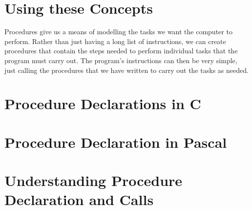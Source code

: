 
\clearpage
\section{Using these Concepts} %
\label{sec:using_these_concepts_procedure_decl}

Procedures give us a means of modelling the tasks we want the computer to perform. Rather than just having a long list of instructions, we can create procedures that contain the steps needed to perform individual tasks that the program must carry out. The program's instructions can then be very simple, just calling the procedures that we have written to carry out the tasks as needed.





\clearpage
\def\pageLang{c}
\section{Procedure Declarations in C} %
\label{sec:procedure_declaration_in_c}








\clearpage
\def\pageLang{pascal}
\section{Procedure Declaration in Pascal} %
\label{sec:procedure_declaration_in_pascal}


\clearpage
\def\pageLang{none}
\section{Understanding Procedure Declaration and Calls} %
\label{sec:understanding_procedure_declaration_and_calls}

